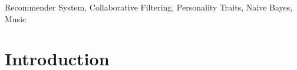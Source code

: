 \documentclass[journal]{IEEEtran}
\begin{document}
\begin{IEEEkeywords}
Recommender System, Collaborative Filtering, Personality Traits, Naive Bayes, Music
\end{IEEEkeywords}






%
\IEEEpeerreviewmaketitle



\section{Introduction}
\end{document}
